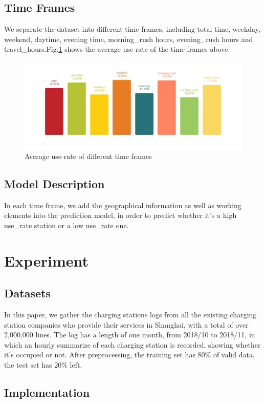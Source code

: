 \subsection{Time Frames}
We separate the dataset into different time frames, including total time, weekday, weekend, daytime, evening time, morning\_rush hours, evening\_rush hours and travel\_hours.Fig.\ref{fig3} shows the average use-rate of the time frames above.
\begin{figure}[!htp]
	\includegraphics[width=\columnwidth]{./figures/timeframes.pdf}
	\centering
	\caption{Average use-rate of different time frames}
	\label{fig3}
\end{figure}

\subsection{Model Description}
In each time frame, we add the geographical information as well as working elements into the prediction model, in order to predict whether it’s a high use\_rate station or a low use\_rate one.
\section{Experiment}

\subsection{Datasets}
In this paper, we gather the charging stations logs from all the existing charging station companies who provide their services in Shanghai, with a total of over 2,000,000 lines. The log has a length of one month, from 2018/10 to 2018/11, in which an hourly summarize of each charging station is recorded, showing whether it's occupied or not. After preprocessing, the training set has 80\% of valid data, the test set has 20\% left.

\subsection{Implementation}

